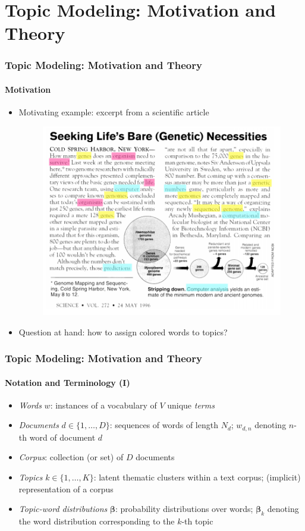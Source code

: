 \documentclass[xcolor=dvipsnames]{beamer}
\begin{document}
\section{Topic Modeling: Motivation and Theory}
\begin{frame}
\frametitle{Topic Modeling: Motivation and Theory}
\framesubtitle{Motivation}
\begin{itemize}
\item Motivating example: excerpt from a scientific article \cite{blei2012presentation}
	\begin{figure}[h!]
  	\centering
  	\includegraphics[scale = 0.30]{../plots/presentation/motivation.png}
	\end{figure}
\item Question at hand: how to assign colored words to topics?
\end{itemize}
\end{frame}

\begin{frame}
\frametitle{Topic Modeling: Motivation and Theory}
\framesubtitle{Notation and Terminology (I)}
\begin{itemize}
\item \textit{Words} $w$: instances of a vocabulary of $V$ unique \textit{terms}
\item \textit{Documents} $d \in \{1,\dots,D\}$: sequences of words of length $N_{d}$; $w_{d,n}$ denoting $n$-th word of document $d$
\item \textit{Corpus}: collection (or set) of $D$ documents
\item \textit{Topics} $k \in \{1,\dots,K\}$: latent thematic clusters within a text corpus; (implicit) representation of a corpus
\item \textit{Topic-word distributions} $\boldsymbol{\beta}$: probability distributions over words; $\boldsymbol{\beta}_k$ denoting the word distribution corresponding to the $k$-th topic
\end{itemize}
\end{frame}
\end{document}

